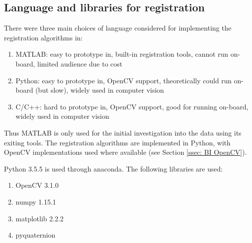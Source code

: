 \documentclass[12pt,a4paper]{article}
\begin{document}
  \subsection{Language and libraries for registration}
    \label{ssec: code registartion}
    There were three main choices of language considered for implementing the registration algorithms in:
    \begin{enumerate}
    \item MATLAB: easy to prototype in, built-in registration tools, cannot run on-board, limited audience due to cost
    \item Python: easy to prototype in, OpenCV support, theoretically could run on-board (but slow), widely used in computer vision
    \item C/C++: hard to prototype in, OpenCV support, good for running on-board, widely used in computer vision
    \end{enumerate}
    Thus MATLAB is only used for the initial investigation into the data using its exiting tools. The registration algorithms are implemented in Python, with OpenCV implementations used where available (see Section \ref{ssec: BI OpenCV}).
     
    Python 3.5.5 is used through anaconda. The following libraries are used: 
    \begin{enumerate}
    \item OpenCV 3.1.0
    \item numpy 1.15.1 
    \item matplotlib 2.2.2
    \item pyquaternion \cite{pyquaternion}
    \end{enumerate}
\end{document}
